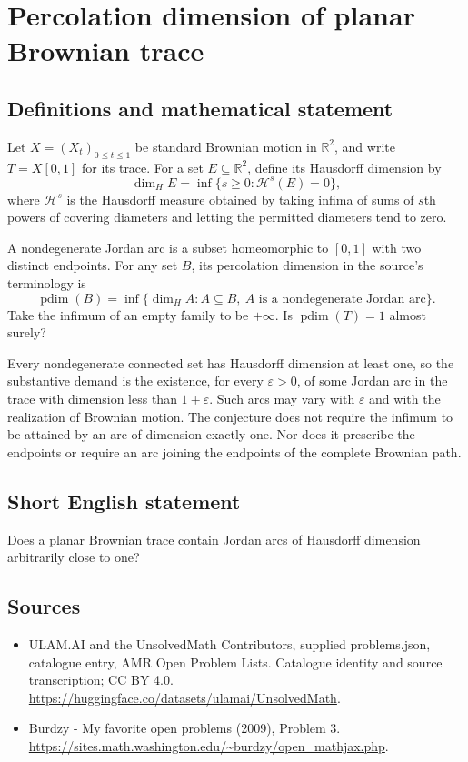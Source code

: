 \documentclass[11pt,a4paper]{article}
\begin{document}
\section*{Percolation dimension of planar Brownian trace}\label{statement}

\subsection{Definitions and mathematical statement}
Let $X=(X_t)_{0\le t\le1}$ be standard Brownian motion in $\mathbb R^2$, and write $T=X[0,1]$ for its trace. For a set $E\subseteq\mathbb R^2$, define its Hausdorff dimension by
\[
\dim_H E=\inf\{s\ge0:\mathcal H^s(E)=0\},
\]
where $\mathcal H^s$ is the Hausdorff measure obtained by taking infima of sums of $s$th powers of covering diameters and letting the permitted diameters tend to zero.

A nondegenerate Jordan arc is a subset homeomorphic to $[0,1]$ with two distinct endpoints. For any set $B$, its percolation dimension in the source's terminology is
\[
\operatorname{pdim}(B)=\inf\{\dim_H A:A\subseteq B,
\ A\text{ is a nondegenerate Jordan arc}\}.
\]
Take the infimum of an empty family to be $+\infty$. Is $\operatorname{pdim}(T)=1$ almost surely?

Every nondegenerate connected set has Hausdorff dimension at least one, so the substantive demand is the existence, for every $\varepsilon>0$, of some Jordan arc in the trace with dimension less than $1+\varepsilon$. Such arcs may vary with $\varepsilon$ and with the realization of Brownian motion. The conjecture does not require the infimum to be attained by an arc of dimension exactly one. Nor does it prescribe the endpoints or require an arc joining the endpoints of the complete Brownian path.
\subsection{Short English statement}
Does a planar Brownian trace contain Jordan arcs of Hausdorff dimension arbitrarily close to one?
\subsection{Sources}
\begin{itemize}
\item[S1] ULAM.AI and the UnsolvedMath Contributors, supplied problems.json, catalogue entry, AMR Open Problem Lists. Catalogue identity and source transcription; CC BY 4.0.
\url{https://huggingface.co/datasets/ulamai/UnsolvedMath}.
\item[S2] Burdzy - My favorite open problems (2009), Problem 3. 
\url{https://sites.math.washington.edu/~burdzy/open_mathjax.php}.
\end{itemize}
\end{document}
